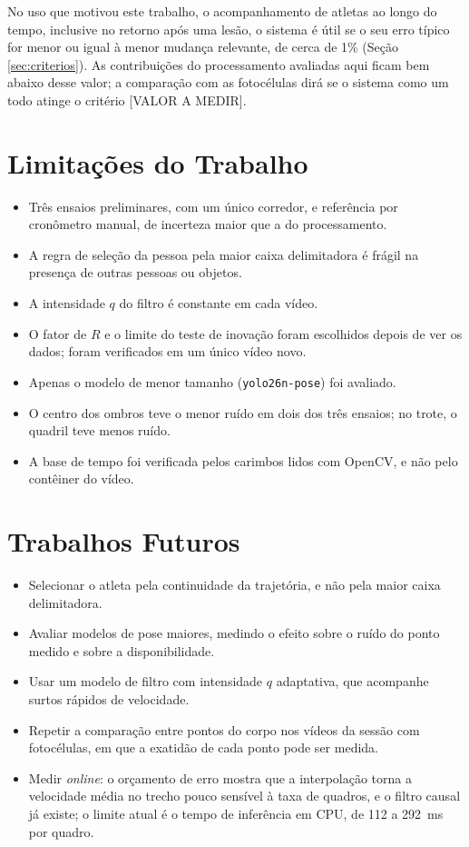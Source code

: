 \documentclass[
    12pt,               %
    openright,          %
    twoside,            %
    a4paper,            %
    chapter=TITLE,      %
    english,            %
    brazil              %
    ]{abntex2}
\begin{document}
No uso que motivou este trabalho, o acompanhamento de atletas ao longo do tempo, inclusive no retorno após uma lesão, o sistema é útil se o seu erro típico for menor ou igual à menor mudança relevante, de cerca de 1\% (Seção \ref{sec:criterios}). As contribuições do processamento avaliadas aqui ficam bem abaixo desse valor; a comparação com as fotocélulas dirá se o sistema como um todo atinge o critério [VALOR A MEDIR].

\section{Limitações do Trabalho}
\begin{itemize}
    \item Três ensaios preliminares, com um único corredor, e referência por cronômetro manual, de incerteza maior que a do processamento.
    \item A regra de seleção da pessoa pela maior caixa delimitadora é frágil na presença de outras pessoas ou objetos.
    \item A intensidade $q$ do filtro é constante em cada vídeo.
    \item O fator de $R$ e o limite do teste de inovação foram escolhidos depois de ver os dados; foram verificados em um único vídeo novo.
    \item Apenas o modelo de menor tamanho (\texttt{yolo26n-pose}) foi avaliado.
    \item O centro dos ombros teve o menor ruído em dois dos três ensaios; no trote, o quadril teve menos ruído.
    \item A base de tempo foi verificada pelos carimbos lidos com OpenCV, e não pelo contêiner do vídeo.
\end{itemize}

\section{Trabalhos Futuros}
\label{sec:trabalhos_futuros}
\begin{itemize}
    \item Selecionar o atleta pela continuidade da trajetória, e não pela maior caixa delimitadora.
    \item Avaliar modelos de pose maiores, medindo o efeito sobre o ruído do ponto medido e sobre a disponibilidade.
    \item Usar um modelo de filtro com intensidade $q$ adaptativa, que acompanhe surtos rápidos de velocidade.
    \item Repetir a comparação entre pontos do corpo nos vídeos da sessão com fotocélulas, em que a exatidão de cada ponto pode ser medida.
    \item Medir \textit{online}: o orçamento de erro mostra que a interpolação torna a velocidade média no trecho pouco sensível à taxa de quadros, e o filtro causal já existe; o limite atual é o tempo de inferência em CPU, de 112 a 292~ms por quadro.
\end{itemize}
\end{document}

